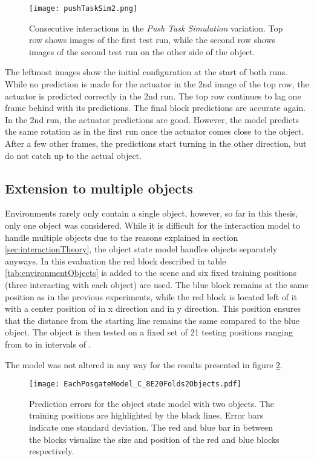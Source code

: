 \begin{figure}
\centering
\texttt{[image: pushTaskSim2.png]}
\caption{Consecutive interactions in the \textit{Push Task Simulation} variation. Top row shows images of the first test run, while the second row shows images of the second test run on the other side of the object. }
\label{fig:pushTaskSim2}
\end{figure}

The leftmost images show the initial configuration at the start of both runs. While no prediction is made for the actuator in the 2nd image of the top row, the actuator is predicted correctly in the 2nd run. The top row continues to lag one frame behind with its predictions. The final block predictions are accurate again.
In the 2nd run, the actuator predictions are good. However, the model predicts the same rotation as in the first run once the actuator comes close to the object. After a few other frames, the predictions start turning in the other direction, but do not catch up to the actual object.


\subsection{Extension to multiple objects \label{sec:multipleObjects}}

Environments rarely only contain a single object, however, so far in this thesis, only one object was considered. While it is difficult for the interaction model to handle multiple objects due to the reasons explained in section \ref{sec:interactionTheory}, the object state model handles objects separately anyways. In this evaluation the red block described in table \ref{tab:environmentObjects} is added to the scene and six fixed training positions (three interacting with each object) are used. The blue block remains at the same position as in the previous experiments, while the red block is located left of it with a center position of  in x direction and  in y direction. This position ensures that the distance from the starting line remains the same compared to the blue object.
The object is then tested on a fixed set of 21 testing positions ranging from  to  in intervals of .

The model was not altered in any way for the results presented in figure \ref{fig:eachPosTwoObjects}.

\begin{figure}
\centering
\texttt{[image: EachPosgateModel\_C\_8E20Folds2Objects.pdf]}
\caption{Prediction errors for the object state model with two objects. The training positions are highlighted by the black lines. Error bars indicate one standard deviation. The red and blue bar in between the blocks visualize the size and position of the red and blue blocks respectively.}
\label{fig:eachPosTwoObjects}
\end{figure}

